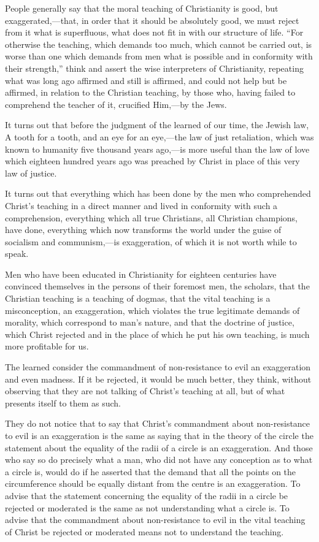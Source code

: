 \documentclass{book}
\begin{document}
People generally say that the moral teaching of Christianity is good, but exaggerated,—that, in order that it should be absolutely good, we must reject from it what is superfluous, what does not fit in with our structure of life. “For otherwise the teaching, which demands too much, which cannot be carried out, is worse than one which demands from men what is possible and in conformity with their strength,” think and assert the wise interpreters of Christianity, repeating what was long ago affirmed and still is affirmed, and could not help but be affirmed, in relation to the Christian teaching, by those who, having failed to comprehend the teacher of it, crucified Him,—by the Jews.

It turns out that before the judgment of the learned of our time, the Jewish law, A tooth for a tooth, and an eye for an eye,—the law of just retaliation, which was known to humanity five thousand years ago,—is more useful than the law of love which eighteen hundred years ago was preached by Christ in place of this very law of justice.

It turns out that everything which has been done by the men who comprehended Christ’s teaching in a direct manner and lived in conformity with such a comprehension, everything which all true Christians, all Christian champions, have done, everything which now transforms the world under the guise of socialism and communism,—is exaggeration, of which it is not worth while to speak.

Men who have been educated in Christianity for eighteen centuries have convinced themselves in the persons of their foremost men, the scholars, that the Christian teaching is a teaching of dogmas, that the vital teaching is a misconception, an exaggeration, which violates the true legitimate demands of morality, which correspond to man’s nature, and that the doctrine of justice, which Christ rejected and in the place of which he put his own teaching, is much more profitable for us.

The learned consider the commandment of non-resistance to evil an exaggeration and even madness. If it be rejected, it would be much better, they think, without observing that they are not talking of Christ’s teaching at all, but of what presents itself to them as such.

They do not notice that to say that Christ’s commandment about non-resistance to evil is an exaggeration is the same as saying that in the theory of the circle the statement about the equality of the radii of a circle is an exaggeration. And those who say so do precisely what a man, who did not have any conception as to what a circle is, would do if he asserted that the demand that all the points on the circumference should be equally distant from the centre is an exaggeration. To advise that the statement concerning the equality of the radii in a circle be rejected or moderated is the same as not understanding what a circle is. To advise that the commandment about non-resistance to evil in the vital teaching of Christ be rejected or moderated means not to understand the teaching.
\end{document}
